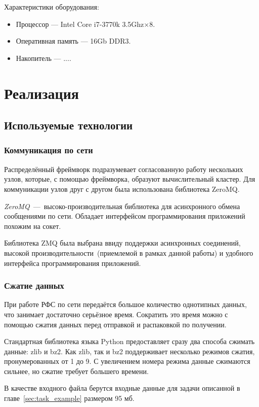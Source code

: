 \documentclass[12pt,a4paper,oneside]{extarticle}
\begin{document}
        \noindent Характеристики оборудования:
        \begin{itemize}
            \item Процессор --- Intel Core i7-3770k 3.5Ghz$\times$8.
            \item Оперативная память --- 16Gb DDR3.
            \item Накопитель --- ....
        \end{itemize}
\clearpage

\section{Реализация}
    \subsection{Используемые технологии}
        \subsubsection{Коммуникация по сети}
            Распределённый фреймворк подразумевает согласованную работу нескольких узлов, которые, с помощью фреймворка, образуют вычислительный кластер. Для коммуникации узлов друг с другом была использована библиотека ZeroMQ.

            {\it ZeroMQ}~---~высоко-производительная библиотека для асинхронного обмена сообщениями по сети. Обладает интерфейсом программирования приложений похожим на сокет. 

            Библиотека ZMQ была выбрана ввиду поддержки асинхронных соединений, высокой производительности~(приемлемой в рамках данной работы) и удобного интерфейса программирования приложений.

        \subsubsection{Сжатие данных}
            При работе РФС по сети передаётся большое количество однотипных данных, что занимает достаточно серьёзное время. Сократить это время можно с помощью сжатия данных перед отправкой и распаковкой по получении.

            Стандартная библиотека языка Python предоставляет сразу два способа сжимать данные: zlib и bz2. Как zlib, так и bz2 поддерживает несколько режимов сжатия, пронумерованных от 1 до 9. С увеличением номера режима данные сжимаются сильнее, но сжатие требует большего времени.

            В качестве входного файла берутся входные данные для задачи описанной в главе~\ref{sec:task_example} размером 95 мб.
\end{document}
